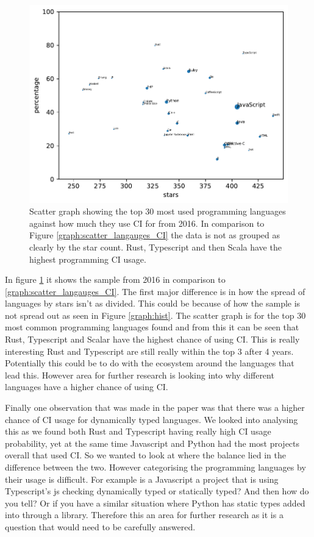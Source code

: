 \documentclass[10pt,conference]{IEEEtran}
\begin{document}
\begin{figure}[!h]
  \centering
  \includegraphics[width=.8\textwidth]{../src/results/scatter.pdf}
  \caption{Scatter graph showing the top 30 most used programming languages against how much they use CI for \citet{Hilton2016} from 2016. In comparison to Figure \ref{graph:scatter_langauges_CI} the data is not as grouped as clearly by the star count. Rust, Typescript and then Scala have the highest programming CI usage.}
  \label{graph:scatter_langauges_CI_2016}
\end{figure}

In figure \ref{graph:scatter_langauges_CI_2016} it shows the sample from 2016 in comparison to \ref{graph:scatter_langauges_CI}. The first major difference is in how the spread of languages by stars isn't as divided. This could be because of how the sample is not spread out as seen in Figure \ref{graph:hist}. The scatter graph is for the top 30 most common programming languages found and from this it can be seen that Rust, Typescript and Scalar have the highest chance of using CI. This is really interesting Rust and Typescript are still really within the top 3 after 4 years. Potentially this could be to do with the ecosystem around the languages that lead this. However area for further research is looking into why different languages have a higher chance of using CI. 

Finally one observation that was made in the \citet{Hilton2016} paper was that there was a higher chance of CI usage for dynamically typed languages. We looked into analysing this as we found both Rust and Typescript having really high CI usage probability, yet at the same time Javascript and Python had the most projects overall that used CI. So we wanted to look at where the balance lied in the difference between the two. However categorising the programming languages by their usage is difficult. For example is a Javascript a project that is using Typescript's js checking dynamically typed or statically typed? And then how do you tell? Or if you have a similar situation where Python has static types added into through a library. Therefore this an area for further research as it is a question that would need to be carefully answered.
\end{document}
